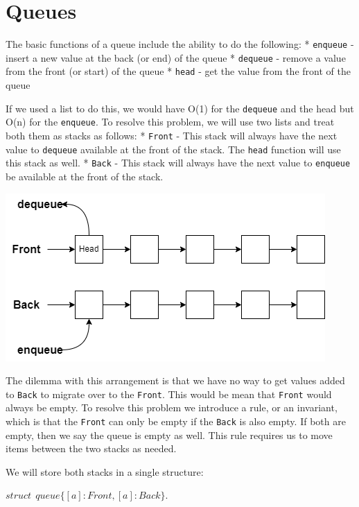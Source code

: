 \documentclass[
]{book}
\begin{document}
\hypertarget{queues}{%
\section{Queues}\label{queues}}

The basic functions of a queue include the ability to do the following:
* \texttt{enqueue} - insert a new value at the back (or end) of the queue
* \texttt{dequeue} - remove a value from the front (or start) of the queue
* \texttt{head} - get the value from the front of the queue

If we used a list to do this, we would have O(1) for the \texttt{dequeue} and the head but O(n) for the \texttt{enqueue}. To resolve this problem, we will use two lists and treat both them as stacks as follows:
* \texttt{Front} - This stack will always have the next value to \texttt{dequeue} available at the front of the stack. The \texttt{head} function will use this stack as well.
* \texttt{Back} - This stack will always have the next value to \texttt{enqueue} be available at the front of the stack.

\includegraphics{images/queue.drawio.png}

The dilemma with this arrangement is that we have no way to get values added to \texttt{Back} to migrate over to the \texttt{Front}. This would be mean that \texttt{Front} would always be empty. To resolve this problem we introduce a rule, or an invariant, which is that the \texttt{Front} can only be empty if the \texttt{Back} is also empty. If both are empty, then we say the queue is empty as well. This rule requires us to move items between the two stacks as needed.

We will store both stacks in a single structure:

\begin{formulabox}
\(struct ~ ~ queue \lbrace [a] : Front, [a] : Back \rbrace.\)

\end{formulabox}
\end{document}
